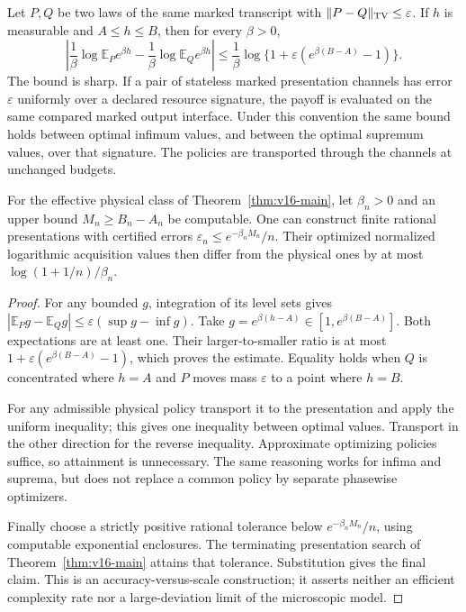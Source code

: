 \begin{theorem}
\label{thm:v16-exponential}
Let $P,Q$ be two laws of the same marked transcript with
$\|P-Q\|_{\rm TV}\le\varepsilon$. If $h$ is measurable and
$A\le h\le B$, then for every $\beta>0$,
\begin{equation}\label{eq:v16-logtransfer}
 \left|\frac1\beta\log\mathbb E_Pe^{\beta h}
       -\frac1\beta\log\mathbb E_Qe^{\beta h}\right|
 \le\frac1\beta\log\{1+\varepsilon(e^{\beta(B-A)}-1)\}.
\end{equation}
The bound is sharp. If a pair of stateless marked presentation channels
has error $\varepsilon$ uniformly over a declared resource signature,
the payoff is evaluated on the same compared marked output interface.
Under this convention the same bound holds between optimal infimum values, and between
the optimal supremum values, over that signature. The policies are
transported through the channels at unchanged budgets.

For the effective physical class of Theorem~\ref{thm:v16-main}, let
$\beta_n>0$ and an upper bound $M_n\ge B_n-A_n$ be computable.
One can construct finite rational presentations with certified errors
$\varepsilon_n\le e^{-\beta_nM_n}/n$. Their optimized normalized
logarithmic acquisition values then differ from the physical ones
by at most $\log(1+1/n)/\beta_n$.
\end{theorem}
\begin{proof}
For any bounded $g$, integration of its level sets gives
$|\mathbb E_Pg-\mathbb E_Qg|\le\varepsilon(\sup g-\inf g)$.
Take $g=e^{\beta(h-A)}\in[1,e^{\beta(B-A)}]$. Both expectations
are at least one. Their larger-to-smaller ratio is at most
$1+\varepsilon(e^{\beta(B-A)}-1)$, which proves the estimate.
Equality holds when $Q$ is concentrated where $h=A$ and $P$ moves
mass $\varepsilon$ to a point where $h=B$.

For any admissible physical policy transport it to the presentation
and apply the uniform inequality; this gives one inequality between
optimal values. Transport in the other direction for the reverse
inequality. Approximate optimizing policies suffice, so attainment is
unnecessary. The same reasoning works for infima and suprema, but does
not replace a common policy by separate phasewise optimizers.

Finally choose a strictly positive rational tolerance below
$e^{-\beta_nM_n}/n$, using computable exponential enclosures. The
terminating presentation search of Theorem~\ref{thm:v16-main} attains
that tolerance. Substitution gives the final claim. This is an
accuracy-versus-scale construction; it asserts neither an efficient
complexity rate nor a large-deviation limit of the microscopic model.
\end{proof}

